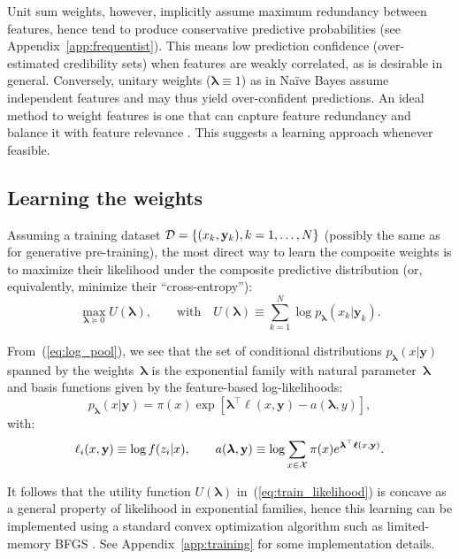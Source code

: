 \documentclass[english]{scrartcl}
\def\y{{\mathbf{y}}}
\newcommand{\blambda}{{\boldsymbol{\lambda}}}
\newcommand{\bell}{{\boldsymbol{\ell}}}
\begin{document}

Unit sum weights, however, implicitly assume maximum redundancy between features, hence tend to produce conservative predictive probabilities (see Appendix~\ref{app:frequentist}). This means low prediction confidence (over-estimated credibility sets) when features are weakly correlated, as is desirable in general. Conversely, unitary weights ($\blambda\equiv 1$) as in Na\"ive Bayes assume independent features and may thus yield over-confident predictions. An ideal method to weight features is one that can capture feature redundancy and balance it with feature relevance \cite{Peng-05}. This suggests a learning approach whenever feasible.



\subsection{Learning the weights}
\label{sec:learning}

Assuming a training dataset ${\cal D}=\{(x_k,\y_k), k=1,\ldots,N\}$ (possibly the same as for generative pre-training), the most direct way to learn the composite weights is to maximize their likelihood under the composite predictive distribution (or, equivalently, minimize their ``cross-entropy''):
\begin{equation}
\label{eq:train_likelihood}
\max_{\blambda\succeq 0} U(\blambda),
\qquad \text{with} \quad
U(\blambda) \equiv\sum_{k=1}^N \log p_\blambda(x_k|\y_k).
\end{equation}

From~(\ref{eq:log_pool}), we see that the set of conditional distributions $p_\blambda(x|\y)$ spanned by the weights~$\blambda$ is the exponential family with natural parameter~$\blambda$ and basis functions given by the feature-based log-likelihoods:
$$
p_\blambda(x|\y) = \pi(x) \exp[\blambda^\top \bell(x,\y) - a(\blambda,y)],
$$
with:
$$
\ell_i(x,\y) \equiv \log f(z_i|x),
\qquad
a(\blambda, \y) \equiv \log \sum_{x\in{\cal X}} \pi(x) e^{\blambda^\top \bell(x,\y)}.
$$

It follows that the utility function $U(\blambda)$ in~(\ref{eq:train_likelihood}) is concave as a general property of likelihood in exponential families, hence this learning can be implemented using a standard convex optimization algorithm such as limited-memory BFGS \cite{Byrd-95}. See Appendix~\ref{app:training} for some implementation details. 
\end{document}
